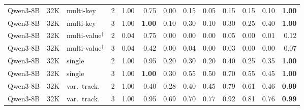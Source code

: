 \begin{tabular}{@{}llllrrrrrrrrr@{}}
\addlinespace[1pt]
Qwen3-8B & 32K & multi-key & 2 & 1.00 & 0.75 & 0.00 & 0.15 & 0.05 & 0.15 & 0.15 & 0.10 & \textbf{1.00} \\
Qwen3-8B & 32K & multi-key & 3 & 1.00 & \textbf{1.00} & 0.10 & 0.30 & 0.10 & 0.30 & 0.25 & 0.40 & \textbf{1.00} \\
Qwen3-8B & 32K & multi-value$^\ddagger$ & 2 & 0.04 & 0.75 & 0.00 & 0.00 & 0.00 & 0.05 & 0.00 & 0.01 & 0.12 \\
Qwen3-8B & 32K & multi-value$^\ddagger$ & 3 & 0.04 & 0.42 & 0.00 & 0.04 & 0.00 & 0.03 & 0.00 & 0.00 & 0.07 \\
Qwen3-8B & 32K & single & 2 & 1.00 & 0.95 & 0.20 & 0.30 & 0.20 & 0.40 & 0.25 & 0.35 & \textbf{1.00} \\
Qwen3-8B & 32K & single & 3 & 1.00 & \textbf{1.00} & 0.30 & 0.55 & 0.50 & 0.70 & 0.55 & 0.45 & \textbf{1.00} \\
Qwen3-8B & 32K & var.\ track. & 2 & 1.00 & 0.40 & 0.28 & 0.40 & 0.45 & 0.79 & 0.61 & 0.46 & \textbf{0.99} \\
Qwen3-8B & 32K & var.\ track. & 3 & 1.00 & 0.95 & 0.69 & 0.70 & 0.77 & 0.92 & 0.81 & 0.76 & \textbf{0.99} \\
\bottomrule
\end{tabular}
